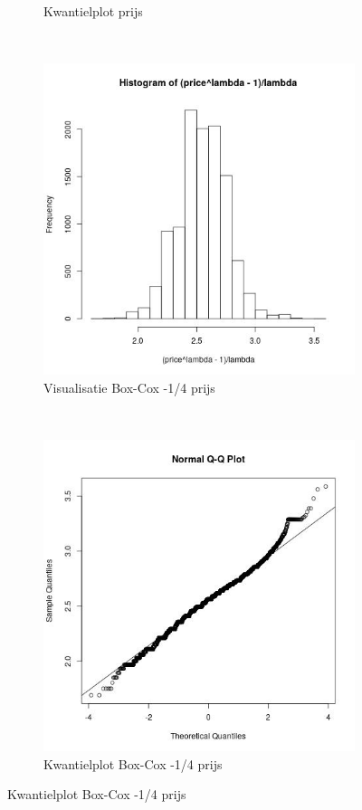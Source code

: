 \documentclass[a4paper,kulak]{kulakarticle} %
\begin{document}
\begin{figure}[H]
\begin{subfigure}[b]{0.45\textwidth}
		\caption{Kwantielplot prijs}
		\label{fig:qqp}
	\end{subfigure}
	~
	\begin{subfigure}[b]{0.45\textwidth}
		\includegraphics[width=\textwidth]{prijsB.jpg}
		\caption{Visualisatie Box-Cox -1/4 prijs}
		\label{fig:bpv}
	\end{subfigure}
	~ %
	\begin{subfigure}[b]{0.45\textwidth}
		\includegraphics[width=\textwidth]{qqbp.jpg}
		\caption{Kwantielplot Box-Cox -1/4 prijs}
		\label{fig:qqbp}
	\end{subfigure}
\end{figure}
\end{document}

